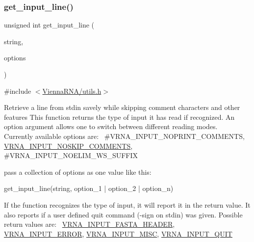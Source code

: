 \subsubsection{\texorpdfstring{get\+\_\+input\+\_\+line()}{get\_input\_line()}}
{\footnotesize\ttfamily unsigned int get\+\_\+input\+\_\+line (\begin{DoxyParamCaption}\item[{char $\ast$$\ast$}]{string,  }\item[{unsigned int}]{options }\end{DoxyParamCaption})}



{\ttfamily \#include $<$\mbox{\hyperlink{utils_8h}{Vienna\+R\+N\+A/utils.\+h}}$>$}

Retrieve a line from \textquotesingle{}stdin\textquotesingle{} savely while skipping comment characters and other features This function returns the type of input it has read if recognized. An option argument allows one to switch between different reading modes.~\newline
Currently available options are\+:~\newline
\#\+V\+R\+N\+A\+\_\+\+I\+N\+P\+U\+T\+\_\+\+N\+O\+P\+R\+I\+N\+T\+\_\+\+C\+O\+M\+M\+E\+N\+TS, \mbox{\hyperlink{group__utils_ga0f6311f11bed1842e3a527ab27b294c6}{V\+R\+N\+A\+\_\+\+I\+N\+P\+U\+T\+\_\+\+N\+O\+S\+K\+I\+P\+\_\+\+C\+O\+M\+M\+E\+N\+TS}}, \#\+V\+R\+N\+A\+\_\+\+I\+N\+P\+U\+T\+\_\+\+N\+O\+E\+L\+I\+M\+\_\+\+W\+S\+\_\+\+S\+U\+F\+F\+IX

pass a collection of options as one value like this\+: \begin{DoxyVerb}get_input_line(string, option_1 | option_2 | option_n) \end{DoxyVerb}


If the function recognizes the type of input, it will report it in the return value. It also reports if a user defined \textquotesingle{}quit\textquotesingle{} command (-\/sign on \textquotesingle{}stdin\textquotesingle{}) was given. Possible return values are\+:~\newline
\mbox{\hyperlink{group__utils_ga2f0d8069e93d3ac54d9320d6bdb8e7e7}{V\+R\+N\+A\+\_\+\+I\+N\+P\+U\+T\+\_\+\+F\+A\+S\+T\+A\+\_\+\+H\+E\+A\+D\+ER}}, \mbox{\hyperlink{group__utils_gad403c9ea58f1836689404c2931419c8c}{V\+R\+N\+A\+\_\+\+I\+N\+P\+U\+T\+\_\+\+E\+R\+R\+OR}}, \mbox{\hyperlink{group__utils_ga8e3241b321c9c1a78a69e59e2e019a71}{V\+R\+N\+A\+\_\+\+I\+N\+P\+U\+T\+\_\+\+M\+I\+SC}}, \mbox{\hyperlink{group__utils_ga72f3c6ca5c83d2b9baed2922d19c403d}{V\+R\+N\+A\+\_\+\+I\+N\+P\+U\+T\+\_\+\+Q\+U\+IT}}


